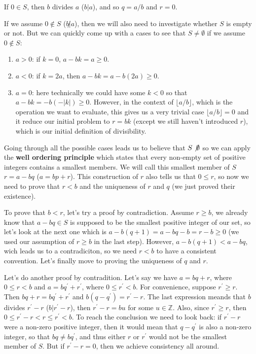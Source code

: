 If $0\in S$, then $b$ divides $a$ ($b|a$), and so $q = a/b$ and $r=0$.

If we assume $0\notin S$ ($b\not| a$), then we will also need to investigate whether $S$ is empty or not.
But we can quickly come up with a cases to see that $S \neq \emptyset$ if we assume $0\notin S$:
\begin{enumerate}
    \item $a>0$: if $k=0$, $a - bk = a\geq 0$.
    \item $a<0$: if $k = 2a$, then $a - bk = a - b(2a) \geq 0$.
    \item $a=0$: here technically we could have some $k<0$ so that $a - bk = -b(-|k|) \geq 0$. However,
    in the context of $\lfloor a/b \rfloor$, which is the operation we want to evaluate, this gives us a very
    trivial case $\lfloor a/b \rfloor = 0$ and it reduce our initial problem to $r = bk$ (except we still haven't
    introduced $r$), which is our initial definition of divisibility.
\end{enumerate}
Going through all the possible cases leads us to believe that $S\not \emptyset$
so we can apply the \textbf{well ordering principle} which states that every non-empty set of positive
integers contains a smallest members.
We will call this smallest member of $S$ $r = a - bq$ ($a = bp + r$).
This construction of $r$ also tells us that $0 \leq r$, so now we need to prove that $r < b$ and the
uniqueness of $r$ and $q$ (we just proved their existence).

To prove that $b < r$, let's try a proof by contradiction.
Assume $r \geq b$, we already know that $a - bq \in S$ is supposed to be the smallest positive integer of our set,
so let's look at the next one which is $a - b(q+1) = a - bq - b = r - b \geq 0$ (we used our assumption of
$r \geq b$ in the last step).
However, $a - b(q+1) < a - bq$, wich leads us to a contradiciton, so we need $r < b$ to have a consistent
convention.
Let's finally move to proving the uniqueness of $q$ and $r$.

Let's do another proof by contradition.
Let's say we have $a = bq + r$, where $0 \leq r < b$ and $a = bq^\prime + r^\prime$, where $0 \leq r^\prime < b$.
For convenience, suppose $r^\prime \geq r$.
Then $bq + r = bq^\prime + r^\prime$ and $b(q - q^\prime) = r^\prime -r$.
The last expression meands that $b$ divides $r^\prime - r$ ($b | r^\prime-r$), then $r^\prime-r = bu$ for some $u\in\mathbb{Z}$.
Also, since $r^\prime \geq r$, then $0 \leq r^\prime - r < r \leq r^\prime < b$.
To reach the conclusion we need to look back: if $r^\prime - r$ were a non-zero positive integer, then it would mean
that $q - q^\prime$ is also a non-zero integer, so that $bq \neq bq^\prime$, and thus either $r$ or $r^\prime$ would not be the
smallest member of $S$. But if $r^\prime - r = 0$, then we achieve consistency all around.



